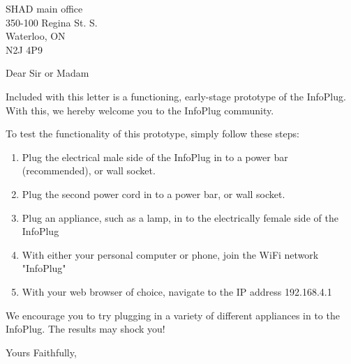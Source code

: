 \documentclass[]{letter}
\begin{document}
	\signature{InfoPlug Ltd.}
	\address{Memorial University of Newfoundland \\ St. Johns,  NL\\A1B 3X9}
	\begin{letter}{SHAD main office \\ 350-100 Regina St. S. \\ Waterloo, ON \\ N2J 4P9}
		\opening{Dear Sir or Madam}
		
		Included with this letter is a functioning, early-stage prototype of the InfoPlug. With this, we hereby welcome you to the InfoPlug community. 
		
		 To test the functionality of this prototype, simply follow these steps:
		 \begin{enumerate}
		 	\item Plug the electrical male side of the InfoPlug in to a power bar (recommended), or wall socket.
		 	\item Plug the second power cord in to a power bar, or wall socket. 
		 	\item Plug an appliance, such as a lamp, in to the electrically female side of the InfoPlug
		 	\item With either your personal computer or phone, join the WiFi network "InfoPlug"
		 	\item With your web browser of choice, navigate to the IP address 192.168.4.1
		 \end{enumerate}
		We encourage you to try plugging in a variety of different appliances in to the InfoPlug. The results may shock you!
		
		\closing{Yours Faithfully,}
		
		
	\end{letter}
\end{document}
